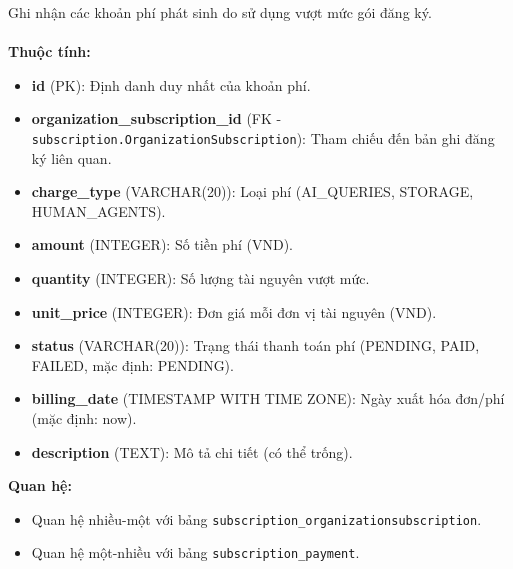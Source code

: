  Ghi nhận các khoản phí phát sinh do sử dụng vượt mức gói đăng ký. \\\\
\indent\textbf{Thuộc tính:}
\begin{itemize}
    \item \textbf{id} (PK): Định danh duy nhất của khoản phí.
    \item \textbf{organization\_subscription\_id} (FK - \texttt{subscription.OrganizationSubscription}): Tham chiếu đến bản ghi đăng ký liên quan.
    \item \textbf{charge\_type} (VARCHAR(20)): Loại phí (AI\_QUERIES, STORAGE, HUMAN\_AGENTS).
    \item \textbf{amount} (INTEGER): Số tiền phí (VND).
    \item \textbf{quantity} (INTEGER): Số lượng tài nguyên vượt mức.
    \item \textbf{unit\_price} (INTEGER): Đơn giá mỗi đơn vị tài nguyên (VND).
    \item \textbf{status} (VARCHAR(20)): Trạng thái thanh toán phí (PENDING, PAID, FAILED, mặc định: PENDING).
    \item \textbf{billing\_date} (TIMESTAMP WITH TIME ZONE): Ngày xuất hóa đơn/phí (mặc định: now).
    \item \textbf{description} (TEXT): Mô tả chi tiết (có thể trống).
\end{itemize}
\textbf{Quan hệ:}
\begin{itemize}
    \item Quan hệ nhiều-một với bảng \texttt{subscription\_organizationsubscription}.
    \item Quan hệ một-nhiều với bảng \texttt{subscription\_payment}.
\end{itemize}

